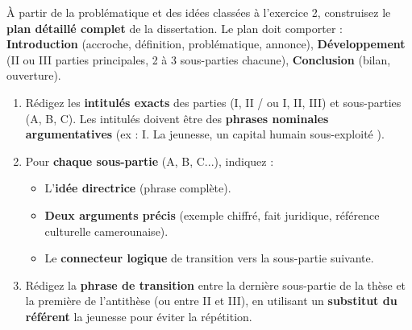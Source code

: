 \documentclass[11pt]{article}
\begin{document}
\begin{exercice}
\noindent À partir de la problématique et des idées classées à l'exercice 2, construisez le \textbf{plan détaillé complet} de la dissertation. Le plan doit comporter : \textbf{Introduction} (accroche, définition, problématique, annonce), \textbf{Développement} (II ou III parties principales, 2 à 3 sous-parties chacune), \textbf{Conclusion} (bilan, ouverture).

\begin{enumerate}
    \item Rédigez les \textbf{intitulés exacts} des parties (I, II / ou I, II, III) et sous-parties (A, B, C). Les intitulés doivent être des \textbf{phrases nominales argumentatives} (ex : \og I. La jeunesse, un capital humain sous-exploité \fg).
    \item Pour \textbf{chaque sous-partie} (A, B, C...), indiquez :
    \begin{itemize}
        \item L'\textbf{idée directrice} (phrase complète).
        \item \textbf{Deux arguments précis} (exemple chiffré, fait juridique, référence culturelle camerounaise).
        \item Le \textbf{connecteur logique} de transition vers la sous-partie suivante.
    \end{itemize}
    \item Rédigez la \textbf{phrase de transition} entre la dernière sous-partie de la thèse et la première de l'antithèse (ou entre II et III), en utilisant un \textbf{substitut du référent} \og la jeunesse \fg{} pour éviter la répétition.
\end{enumerate}
\end{exercice}
\end{document}
